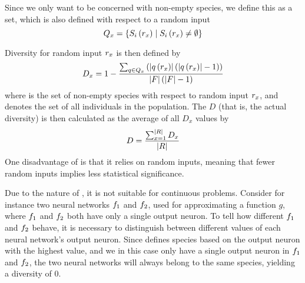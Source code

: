Since we only want to be concerned with non-empty species, we define this as a set, which is also defined with respect to a random input
\begin{equation*}\label{eq:nonemptyspecies}
  Q_{x} = \left\{ S_{i}\left(r_x\right) \mid S_{i}\left(r_x\right) \neq \emptyset \right\}
\end{equation*}

Diversity for random input $r_x$ is then defined by
%
\begin{equation*}\label{eq:sdi}
  D_x = 1 - \frac{\sum_{q \in Q_{x}}\left(\lvert q\left(r_x\right)\rvert\left(\lvert q\left(r_x\right)\rvert - 1\right)\right)}{\lvert F\rvert\left(\lvert F\rvert - 1\right)}
\end{equation*}
%
where  is the set of non-empty species with respect to random input $r_x$, and \indset{} denotes the set of all individuals in the population. The \dia{} $D$ (that is, the actual diversity) is then calculated as the average of all \ransetl{} $D_x$ values by
%
\[
  D =\frac{\sum_{x=1}^{\lvert R\rvert}{D_x}}{\lvert R\rvert}
\]
%
One disadvantage of \dia{} is that it relies on random inputs, meaning that fewer random inputs implies less statistical significance. 

Due to the nature of \dia, it is not suitable for continuous problems. Consider for instance two neural networks $f_1$ and $f_2$, used for approximating a function $g$, where $f_1$ and $f_2$ both have only a single output neuron. To tell how different $f_1$ and $f_2$ behave, it is necessary to distinguish between different values of each neural network's output neuron. Since \dia{} defines species based on the output neuron with the highest value, and we in this case only have a single output neuron in $f_1$ and $f_2$, the two neural networks will always belong to the same species, yielding a diversity of 0.  
